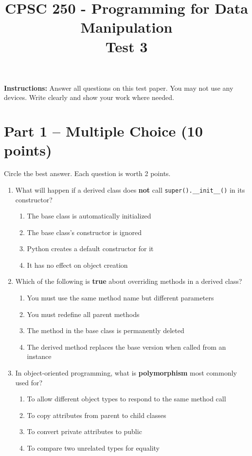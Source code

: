 \documentclass[11pt]{article}
\title{CPSC 250 - Programming for Data Manipulation\\Test 3}
\date{}
\begin{document}
\maketitle

\textbf{Instructions:} Answer all questions on this test paper. You may not use any devices. Write clearly and show your work where needed.

\section*{Part 1 – Multiple Choice (10 points)}

Circle the best answer. Each question is worth 2 points.

\begin{enumerate}[label=\arabic*.]
    \item What will happen if a derived class does \textbf{not} call \texttt{super().\_\_init\_\_()} in its constructor?
    \begin{enumerate}[label=\alph*)]
        \item The base class is automatically initialized
        \item The base class’s constructor is ignored
        \item Python creates a default constructor for it
        \item It has no effect on object creation
    \end{enumerate}

    \item Which of the following is \textbf{true} about overriding methods in a derived class?
    \begin{enumerate}[label=\alph*)]
        \item You must use the same method name but different parameters
        \item You must redefine all parent methods
        \item The method in the base class is permanently deleted
        \item The derived method replaces the base version when called from an instance
    \end{enumerate}

    \item In object-oriented programming, what is \textbf{polymorphism} most commonly used for?
    \begin{enumerate}[label=\alph*)]
        \item To allow different object types to respond to the same method call
        \item To copy attributes from parent to child classes
        \item To convert private attributes to public
        \item To compare two unrelated types for equality
    \end{enumerate}
    

\end{enumerate}
\end{document}
